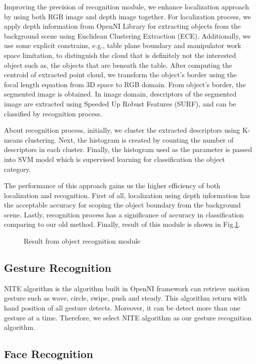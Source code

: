 \documentclass{llncs}
\begin{document}
Improving the precision of recognition module, we enhance localization approach by using both RGB image and depth image together. For localization process, we apply depth information from OpenNI Library for extracting objects from the background scene using Euclidean Clustering Extraction (ECE). Additionally, we use some explicit constrains, e.g., table plane boundary and manipulator work space limitation, to distinguish the cloud that is definitely not the interested object such as, the objects that are beneath the table. After computing the centroid of extracted point cloud, we transform the object's border using the focal length equation from 3D space to RGB domain. From object's border, the segmented image is obtained. In image domain, descriptors of the segmented image are extracted using Speeded Up Robust Features (SURF), and can be classified by recognition process.

About recognition process, initially, we cluster the extracted descriptors using K-means clustering. Next, the histogram is created by counting the number of descriptors in each cluster. Finally, the histogram used as the parameter is passed into SVM model which is supervised learning for classification the object category.

The performance of this approach gains us the higher efficiency of both localization and recognition. First of all, localization using depth information has the acceptable accuracy for scoping the object boundary from the background scene. Lastly, recognition process has a significance of accuracy in classification comparing to our old method. Finally, result of this module is shown in Fig.\ref{fig:object_recog}.

\begin{figure}
\centering
\caption{Result from object recognition module}
\label{fig:object_recog}
\end{figure}

\subsection{Gesture Recognition}

NITE algorithm is the algorithm built in OpenNI framework can retrieve motion gesture such as wave, circle, swipe, push and steady. This algorithm return with hand position of all gesture detects.
Moreover, it can be detect more than one gesture at a time. Therefore, we select NITE algorithm as our
gesture recognition algorithm.

\subsection{Face Recognition}
\end{document}

